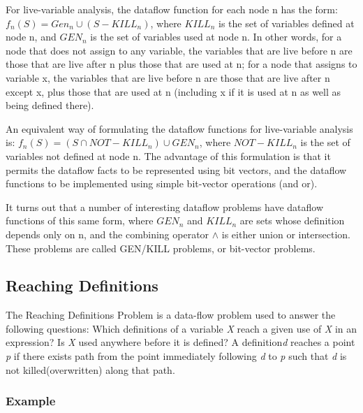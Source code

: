 For live-variable analysis, the dataflow function for each node n has the form: 
\(f_n(S) = Gen_n \cup (S - KILL_n)\), where \(KILL_n\) is the set of variables defined at node n, 
and \(GEN_n\) is the set of variables used at node n. In other words, for a node that does not 
assign to any variable, the variables that are live before n are those that are live after 
n plus those that are used at n; for a node that assigns to variable x, the variables that are 
live before n are those that are live after n except x, plus those that are used at n 
(including x if it is used at n as well as being defined there).

An equivalent way of formulating the dataflow functions for live-variable analysis is: 
\(f_n(S) = (S \cap NOT-KILL_n) \cup GEN_n\), where \(NOT-KILL_n\) is the set of variables not defined
 at node n. The advantage of this formulation is that it permits the dataflow facts to be 
 represented using bit vectors, and the dataflow functions to be implemented using simple 
 bit-vector operations (and or).

It turns out that a number of interesting dataflow problems have dataflow functions of this 
same form, where \(GEN_n\) and \(KILL_n\) are sets whose definition depends only on n, and the combining 
operator \(\wedge\) is either union or intersection. These problems are called GEN/KILL problems, 
or bit-vector problems.


\subsection{Reaching Definitions}

The Reaching Definitions Problem is a data-flow problem used to answer the
following questions: Which definitions of a variable \textit{X} reach a given use of \textit{X} in
an expression? Is \textit{X} used anywhere before it is defined? A definition\textit{d} reaches a point \textit{p} if there exists path 
from the point immediately following \textit{d} to \textit{p} such that \textit{d} is not killed(overwritten) along that path.





\subsubsection{Example}





\subsection{}

